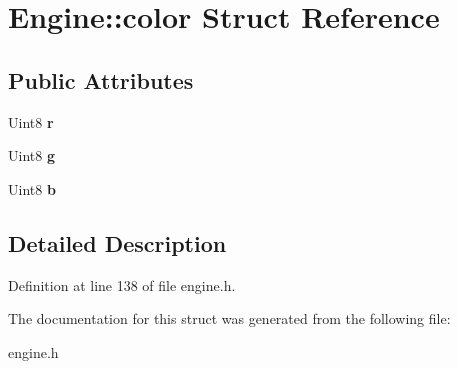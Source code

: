 \hypertarget{structEngine_1_1color}{}\section{Engine\+:\+:color Struct Reference}
\label{structEngine_1_1color}
\subsection*{Public Attributes}
\begin{DoxyCompactItemize}
\item 
Uint8 {\bfseries r}\hypertarget{structEngine_1_1color_ad2f4cb4cb1d9b251100bd1a4ebfa6b1e}{}\label{structEngine_1_1color_ad2f4cb4cb1d9b251100bd1a4ebfa6b1e}

\item 
Uint8 {\bfseries g}\hypertarget{structEngine_1_1color_a3e4b52509fd71e8551d297cd87073af4}{}\label{structEngine_1_1color_a3e4b52509fd71e8551d297cd87073af4}

\item 
Uint8 {\bfseries b}\hypertarget{structEngine_1_1color_a2c684bfdca0608a79500f714671b97e9}{}\label{structEngine_1_1color_a2c684bfdca0608a79500f714671b97e9}

\end{DoxyCompactItemize}


\subsection{Detailed Description}


Definition at line 138 of file engine.\+h.



The documentation for this struct was generated from the following file\+:\begin{DoxyCompactItemize}
\item 
engine.\+h\end{DoxyCompactItemize}
